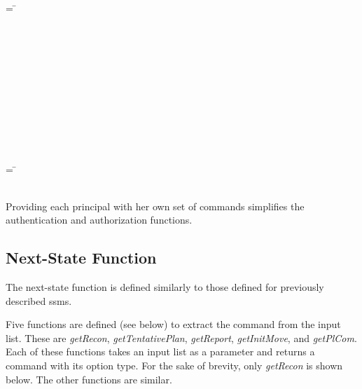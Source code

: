 \documentclass[../../main/main.tex]{subfiles}
\begin{document}
\begin{tabbing}
\parskip=8pt
 = \= \\
					     \>\HOLTokenBar{}  \\
					     \>\HOLTokenBar{}  \\
					     \>\HOLTokenBar{} \\
          				     \>\HOLTokenBar{}  \\
				     	     \>\HOLTokenBar{}  \\
					     \>\HOLTokenBar{}  \\
					     \>\HOLTokenBar{}  \\
					     \>\HOLTokenBar{} \\
          				     \>\HOLTokenBar{}  \\
				     	     \>\HOLTokenBar{}  \\
					     \>\HOLTokenBar{} 
\parskip=18pt
\end{tabbing}

\begin{tabbing}
\parskip=8pt
 = \= \\
						\>\HOLTokenBar{} \\
           					\>\HOLTokenBar{} 
\parskip=18pt
\end{tabbing}

Providing each principal with her own set of commands simplifies the authentication and authorization functions.


\subsection{Next-State Function}
The next-state function is defined similarly to those defined for previously described \glspl{ssm}.  

\HOLssmPlanPBTheoremsplanPBNSXXdef

Five functions are defined (see below) to extract the command from the input list.  These are \textit{getRecon}, \textit{getTentativePlan}, \textit{getReport}, \textit{getInitMove}, and \textit{getPlCom}.  Each of these functions takes an input list as a parameter and returns a command with its option type.  For the sake of brevity, only \textit{getRecon} is shown below.  The other functions are similar.
\end{document}
